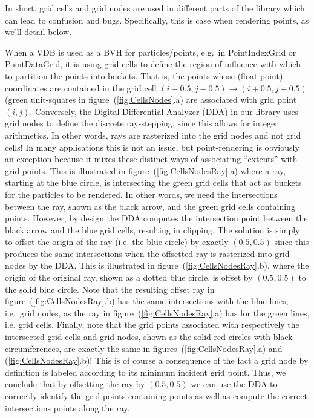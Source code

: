\documentclass[12pt, letterpaper]{article}
\begin{document}
In short, grid cells and grid nodes are used in different parts of the library which can lead to confusion and bugs. Specifically, this is case when rendering points, as we'll detail below.

When a VDB is used as a BVH for particles/points, e.g.\ in PointIndexGrid or PointDataGrid, it is using grid cells to define the region of influence with which to partition the points into buckets. That is, the points whose (float-point) coordinates are contained in the grid cell $(i-0.5,j-0.5)\rightarrow(i+0.5,j+0.5)$ (green unit-squares in figure~(\ref{fig:CellsNodes}.a) are associated with grid point $(i,j)$. Conversely, the Digital Differential Analyzer (DDA) in our library uses grid nodes to define the discrete ray-stepping, since this allows for integer arithmetics. In other words, rays are rasterized into the grid nodes and not grid cells! In many applications this is not an issue, but point-rendering is obviously an exception because it mixes these distinct ways of associating ``extents'' with grid points. This is illustrated in figure~(\ref{fig:CellsNodesRay}.a) where a ray, starting at the blue circle, is intersecting the green grid cells that act as buckets for the particles to be rendered. In other words, we need the intersections between the ray, shown as the black arrow, and the green grid cells containing points. However, by design the DDA computes the intersection point between the black arrow and the blue grid cells, resulting in clipping. The solution is simply to offset the origin of the ray (i.e. the blue circle) by exactly $(0.5,0.5)$ since this produces the same intersections when the offsetted ray is rasterized into grid nodes by the DDA. This is illustrated in figure~(\ref{fig:CellsNodesRay}.b), where the origin of the original ray, shown as a dotted blue circle, is offset by $(0.5,0.5)$ to the solid blue circle. Note that the resulting offset ray in figure~(\ref{fig:CellsNodesRay}.b) has the same intersections with the blue lines, i.e.\ grid nodes, as the ray in figure~(\ref{fig:CellsNodesRay}.a) has for the green lines, i.e. grid cells. Finally, note that the grid points associated with respectively the intersected grid cells and grid nodes, shown as the solid red circles with black circumferences, are exactly the same in  figures~(\ref{fig:CellsNodesRay}.a) and (\ref{fig:CellsNodesRay}.b)! This is of course a consequence of the fact a grid node by definition is labeled according to its minimum incident grid point. Thus, we conclude that by offsetting the ray by $(0.5,0.5)$ we can use the DDA to correctly identify the grid points containing points as well as compute the correct intersections points along the ray. 
\end{document}
